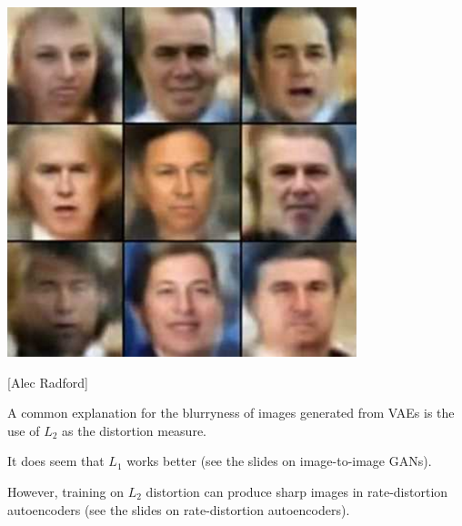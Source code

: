 {\vfill
\centerline{\includegraphics[width = 4in]{../images/VariationalFaces}}
\centerline{[Alec Radford]}


A common explanation for the blurryness of images generated from VAEs is the use of $L_2$ as the distortion measure.

\vfill
It does seem that $L_1$ works better (see the slides on image-to-image GANs).

\vfill
However, training on $L_2$ distortion can produce sharp images in rate-distortion autoencoders (see the slides on rate-distortion autoencoders).


}


